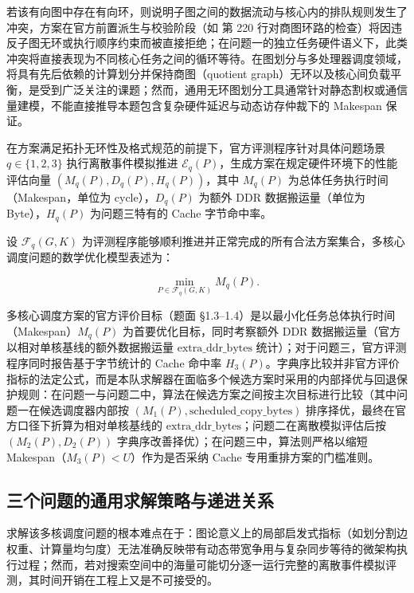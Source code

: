 \documentclass[anonymous,notoc]{gmcm2026}
\begin{document}
若该有向图中存在有向环，则说明子图之间的数据流动与核心内的排队规则发生了冲突，方案在官方前置派生与校验阶段（如 \texttt{} 第 220 行对商图环路的检查）将因违反子图无环或执行顺序约束而被直接拒绝；在问题一的独立任务硬件语义下，此类冲突将直接表现为不同核心任务之间的循环等待。在图划分与多处理器调度领域，将具有先后依赖的计算划分并保持商图（quotient graph）无环以及核心间负载平衡，是受到广泛关注的课题\cite{ref6}；然而，通用无环图划分工具通常针对静态割权或通信量建模，不能直接推导本题包含复杂硬件延迟与动态访存仲裁下的 Makespan 保证。

在方案满足拓扑无环性及格式规范的前提下，官方评测程序针对具体问题场景 \(q \in \{1, 2, 3\}\) 执行离散事件模拟推进 \(\mathcal{E}_q(P)\)，生成方案在规定硬件环境下的性能评估向量 \((M_q(P), D_q(P), H_q(P))\)，其中 \(M_q(P)\) 为总体任务执行时间（Makespan，单位为 cycle），\(D_q(P)\) 为额外 DDR 数据搬运量（单位为 Byte），\(H_q(P)\) 为问题三特有的 Cache 字节命中率。

设 \(\mathcal{F}_q(G, K)\) 为评测程序能够顺利推进并正常完成的所有合法方案集合，多核心调度问题的数学优化模型表述为：

\begin{equation}
\min_{P \in \mathcal{F}_q(G, K)} M_q(P).
\end{equation}

多核心调度方案的官方评价目标（题面 §1.3--1.4）是以最小化任务总体执行时间（Makespan）\(M_q(P)\) 为首要优化目标，同时考察额外 DDR 数据搬运量（官方以相对单核基线的额外数据搬运量 \(\text{extra\_ddr\_bytes}\) 统计）；对于问题三，官方评测程序同时报告基于字节统计的 Cache 命中率 \(H_3(P)\)。字典序比较并非官方评价指标的法定公式，而是本队求解器在面临多个候选方案时采用的内部择优与回退保护规则：在问题一与问题二中，算法在候选方案之间按主次目标进行比较（其中问题一在候选调度器内部按 \((M_1(P), \text{scheduled\_copy\_bytes})\) 排序择优，最终在官方口径下折算为相对单核基线的 \(\text{extra\_ddr\_bytes}\)；问题二在离散模拟评估后按 \((M_2(P), D_2(P))\) 字典序改善择优）；在问题三中，算法则严格以缩短 Makespan（\(M_3(P) < U\)）作为是否采纳 Cache 专用重排方案的门槛准则。

\subsection{三个问题的通用求解策略与递进关系}

求解该多核调度问题的根本难点在于：图论意义上的局部启发式指标（如划分割边权重、计算量均匀度）无法准确反映带有动态带宽争用与复杂同步等待的微架构执行过程；然而，若对搜索空间中的海量可能切分逐一运行完整的离散事件模拟评测，其时间开销在工程上又是不可接受的。
\end{document}
